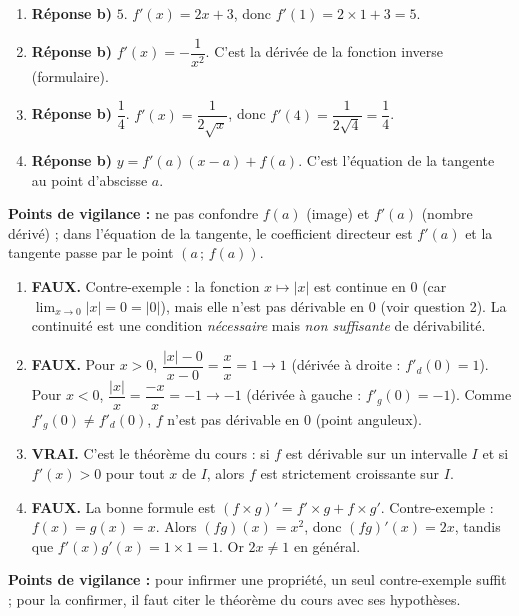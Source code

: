 \documentclass[11pt]{article}
\begin{document}
\begin{corrige}
\begin{enumerate}
\item \textbf{Réponse b) } $5$. $f'(x)=2x+3$, donc $f'(1)=2\times 1+3=5$.
\item \textbf{Réponse b) } $f'(x)=-\dfrac{1}{x^2}$. C'est la dérivée de la fonction inverse (formulaire).
\item \textbf{Réponse b) } $\dfrac{1}{4}$. $f'(x)=\dfrac{1}{2\sqrt{x}}$, donc $f'(4)=\dfrac{1}{2\sqrt{4}}=\dfrac{1}{4}$.
\item \textbf{Réponse b) } $y=f'(a)(x-a)+f(a)$. C'est l'équation de la tangente au point d'abscisse $a$.
\end{enumerate}
\textbf{Points de vigilance :} ne pas confondre $f(a)$ (image) et $f'(a)$ (nombre dérivé) ; dans l'équation de la tangente, le coefficient directeur est $f'(a)$ et la tangente passe par le point $(a\,;\,f(a))$.
\end{corrige}

\begin{corrige}
\begin{enumerate}
\item \textbf{FAUX.} Contre-exemple : la fonction $x\mapsto |x|$ est continue en $0$ (car $\lim_{x\to 0}|x|=0=|0|$), mais elle n'est pas dérivable en $0$ (voir question 2). La continuité est une condition \emph{nécessaire} mais \emph{non suffisante} de dérivabilité.
\item \textbf{FAUX.} Pour $x>0$, $\dfrac{|x|-0}{x-0}=\dfrac{x}{x}=1\longrightarrow 1$ (dérivée à droite : $f'_d(0)=1$). Pour $x<0$, $\dfrac{|x|}{x}=\dfrac{-x}{x}=-1\longrightarrow -1$ (dérivée à gauche : $f'_g(0)=-1$). Comme $f'_g(0)\neq f'_d(0)$, $f$ n'est pas dérivable en $0$ (point anguleux).
\item \textbf{VRAI.} C'est le théorème du cours : si $f$ est dérivable sur un intervalle $I$ et si $f'(x)>0$ pour tout $x$ de $I$, alors $f$ est strictement croissante sur $I$.
\item \textbf{FAUX.} La bonne formule est $(f\times g)'=f'\times g+f\times g'$. Contre-exemple : $f(x)=g(x)=x$. Alors $(fg)(x)=x^2$, donc $(fg)'(x)=2x$, tandis que $f'(x)g'(x)=1\times 1=1$. Or $2x\neq 1$ en général.
\end{enumerate}
\textbf{Points de vigilance :} pour infirmer une propriété, un seul contre-exemple suffit ; pour la confirmer, il faut citer le théorème du cours avec ses hypothèses.
\end{corrige}
\end{document}
